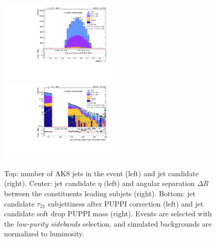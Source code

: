 \begin{figure}[!htb]
\begin{center}
    \includegraphics[width=0.495\textwidth]{plots/v9_thesis/XVZnnlpSB/FatJet1_puppiTau21.pdf}
    \includegraphics[width=0.495\textwidth]{plots/v9_thesis/XVZnnlpSB/FatJet1_softdropPuppiMassCorr.pdf}

    \caption{Top: number of AK8 jets in the event (left) and \V jet candidate \pt (right). Center: \V jet candidate $\eta$ (left) and angular separation $\Delta R$ between the constituents leading subjets (right). Bottom: \V jet candidate $\tau_{21}$ subjettiness after PUPPI correction (left) and \V jet candidate soft drop PUPPI mass (right). Events are selected with the \emph{low-purity sidebands} selection, and simulated backgrounds are normalized to luminosity.}
  \end{center}
\end{figure}

\clearpage

